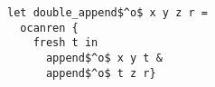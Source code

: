 \begin{lstlisting}
let double_append$^o$ x y z r =
  ocanren {
    fresh t in
      append$^o$ x y t &
      append$^o$ t z r}
\end{lstlisting}
